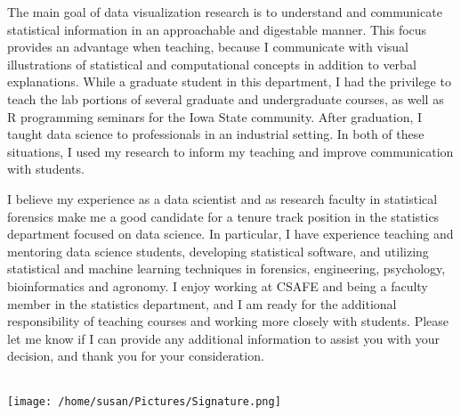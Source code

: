 \documentclass[12pt, letterpaper, sans]{moderncv}
\makeatletter
\renewcommand*{\makeletterclosing}{
  \vspace{1em}\@closing\\%
  \hspace{-1em}\texttt{[image: /home/susan/Pictures/Signature.png]}\\%
  {\bfseries \@firstname~\@lastname}%
  \ifthenelse{\isundefined{\@enclosure}}{}{%
    \\%
    \vfill%
    {\color{color2}\itshape\enclname: \@enclosure}}}
\makeatother
\begin{document}
The main goal of data visualization research is to understand and communicate statistical information in an approachable and digestable manner. This focus provides an advantage when teaching, because I communicate with visual illustrations of statistical and computational concepts in addition to verbal explanations. While a graduate student in this department, I had the privilege to teach the lab portions of several graduate and undergraduate courses, as well as R programming seminars for the Iowa State community. After graduation, I taught data science to professionals in an industrial setting. In both of these situations, I used my research to inform my teaching and improve communication with students. 

I believe my experience as a data scientist and as research faculty in statistical forensics make me a good candidate for a tenure track position in the statistics department focused on data science. In particular, I have experience teaching and mentoring data science students, developing statistical software, and utilizing statistical and machine learning techniques in forensics, engineering, psychology, bioinformatics and agronomy. I enjoy working at CSAFE and being a faculty member in the statistics department, and I am ready for the additional responsibility of teaching courses and working more closely with students. Please let me know if I can provide any additional information to assist you with your decision, and thank you for your consideration.  






\makeletterclosing
\end{document}
